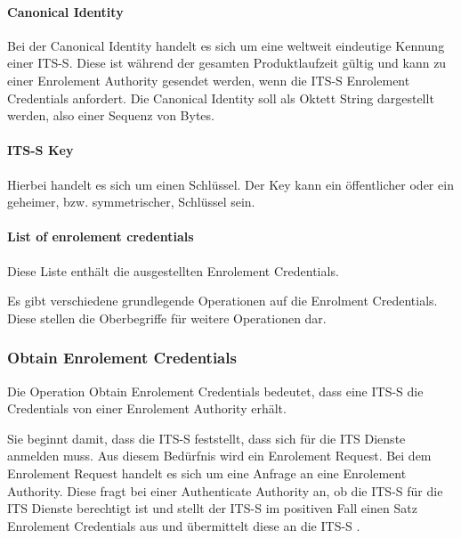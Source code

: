 \paragraph{Canonical Identity} Bei der Canonical Identity handelt es sich um eine weltweit eindeutige Kennung einer \ac{ITS-S}. Diese ist während der gesamten Produktlaufzeit gültig und kann zu einer Enrolement Authority gesendet werden, wenn die \ac{ITS-S} Enrolement Credentials anfordert. Die Canonical Identity soll als Oktett String dargestellt werden, also einer Sequenz von Bytes.

\paragraph{ITS-S Key}
Hierbei handelt es sich um einen Schlüssel. Der Key kann ein öffentlicher oder ein geheimer, bzw. symmetrischer, Schlüssel sein. 

\paragraph{List of enrolement credentials}
Diese Liste enthält die ausgestellten Enrolement Credentials. 

Es gibt verschiedene grundlegende Operationen auf die Enrolment Credentials. Diese stellen die Oberbegriffe für weitere Operationen dar. 


 
\subsubsection{Obtain Enrolement Credentials \label{architektur_obtainEnrolementCredentials}}
Die Operation Obtain Enrolement Credentials bedeutet, dass eine \ac{ITS-S} die Credentials von einer Enrolement Authority erhält. 

Sie beginnt damit, dass die \ac{ITS-S} feststellt, dass sich für die \ac{ITS} Dienste anmelden muss. Aus diesem Bedürfnis wird ein Enrolement Request. Bei dem Enrolement Request handelt es sich um eine Anfrage an eine Enrolement Authority. Diese fragt bei einer Authenticate Authority an, ob die \ac{ITS-S} für die \ac{ITS} Dienste berechtigt ist und stellt der \ac{ITS-S} im positiven Fall einen Satz Enrolement Credentials aus und übermittelt diese an die \ac{ITS-S} .  

